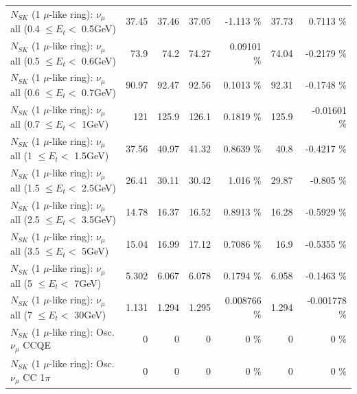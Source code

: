 \begin{table}
\begin{tabular}{| l | r | r | r  r | r  r |}
       $N_{SK}$ (1 $\mu$-like ring): $\nu_{\mu}$ all (0.4 $\leq E_{t} <$ 0.5GeV) &           37.45 &           37.46 &           37.05 &   -1.113 \%  &           37.73 &   0.7113 \%  \\ 
       $N_{SK}$ (1 $\mu$-like ring): $\nu_{\mu}$ all (0.5 $\leq E_{t} <$ 0.6GeV) &            73.9 &            74.2 &           74.27 &  0.09101 \%  &           74.04 &  -0.2179 \%  \\ 
       $N_{SK}$ (1 $\mu$-like ring): $\nu_{\mu}$ all (0.6 $\leq E_{t} <$ 0.7GeV) &           90.97 &           92.47 &           92.56 &   0.1013 \%  &           92.31 &  -0.1748 \%  \\ 
         $N_{SK}$ (1 $\mu$-like ring): $\nu_{\mu}$ all (0.7 $\leq E_{t} <$ 1GeV) &             121 &           125.9 &           126.1 &   0.1819 \%  &           125.9 & -0.01601 \%  \\ 
         $N_{SK}$ (1 $\mu$-like ring): $\nu_{\mu}$ all (1 $\leq E_{t} <$ 1.5GeV) &           37.56 &           40.97 &           41.32 &   0.8639 \%  &            40.8 &  -0.4217 \%  \\ 
       $N_{SK}$ (1 $\mu$-like ring): $\nu_{\mu}$ all (1.5 $\leq E_{t} <$ 2.5GeV) &           26.41 &           30.11 &           30.42 &    1.016 \%  &           29.87 &   -0.805 \%  \\ 
       $N_{SK}$ (1 $\mu$-like ring): $\nu_{\mu}$ all (2.5 $\leq E_{t} <$ 3.5GeV) &           14.78 &           16.37 &           16.52 &   0.8913 \%  &           16.28 &  -0.5929 \%  \\ 
         $N_{SK}$ (1 $\mu$-like ring): $\nu_{\mu}$ all (3.5 $\leq E_{t} <$ 5GeV) &           15.04 &           16.99 &           17.12 &   0.7086 \%  &            16.9 &  -0.5355 \%  \\ 
           $N_{SK}$ (1 $\mu$-like ring): $\nu_{\mu}$ all (5 $\leq E_{t} <$ 7GeV) &           5.302 &           6.067 &           6.078 &   0.1794 \%  &           6.058 &  -0.1463 \%  \\ 
          $N_{SK}$ (1 $\mu$-like ring): $\nu_{\mu}$ all (7 $\leq E_{t} <$ 30GeV) &           1.131 &           1.294 &           1.295 & 0.008766 \%  &           1.294 & -0.001778 \%  \\ 
\hline
\hline
                               $N_{SK}$ (1 $\mu$-like ring): Osc. $\nu_\mu$ CCQE &               0 &               0 &               0 &        0 \%  &               0 &        0 \%  \\ 
                          $N_{SK}$ (1 $\mu$-like ring): Osc. $\nu_\mu$ CC 1$\pi$ &               0 &               0 &               0 &        0 \%  &               0 &        0 \%  \\ 

\end{tabular}
\end{table}
